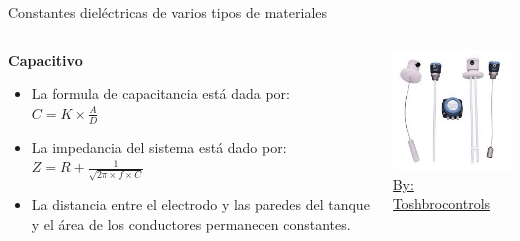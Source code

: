 \documentclass[aspectratio=169]{beamer}
\begin{document}
\begin{frame}{Constantes dieléctricas de varios tipos de materiales}
    \begin{columns}[c, onlytextwidth]
        \begin{column}{0.5\textwidth}
        \textbf{Capacitivo}
            \begin{itemize}
                \item La formula de capacitancia está dada por:\\ $C=K\times \frac{A}{D}$
                \item La impedancia del sistema está dado por: \\
                $Z=R+\frac{1}{\sqrt{2\pi \times f \times C}}$
                \item La distancia entre el electrodo y las paredes del tanque y el área de los conductores permanecen constantes. 
            \end{itemize}
        \end{column}
        \begin{column}{0.50\textwidth}
        \centering
            \includegraphics[width = 0.9\linewidth]{fig/Nivel/capacitance_types.png} \\          \tiny{\href{https://www.toshbrocontrols.com/level-transmitter/rf-capacitance-level-transmitter}{By: Toshbrocontrols}}
           
        \end{column}
    \end{columns}
\end{frame}
\end{document}
